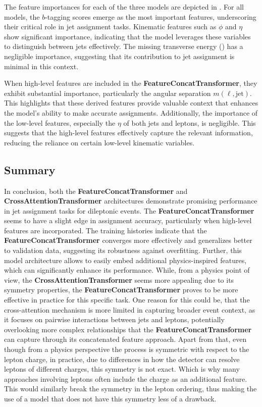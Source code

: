 The feature importances for each of the three models are depicted in . For all models, the $b$-tagging scores emerge as the most important features, underscoring their critical role in jet assignment tasks. Kinematic features such as $\phi$ and $\eta$ show significant importance, indicating that the model leverages these variables to distinguish between jets effectively. The missing transverse energy (\met) has a negligible importance, suggesting that its contribution to jet assignment is minimal in this context.

When high-level features are included in the \textbf{FeatureConcatTransformer}, they exhibit substantial importance, particularly the angular separation $m(\ell,\text{jet})$. This highlights that these derived features provide valuable context that enhances the model's ability to make accurate assignments. Additionally, the importance of the low-level features, especially the $\eta$ of both jets and leptons, is negligible. This suggests that the high-level features effectively capture the relevant information, reducing the reliance on certain low-level kinematic variables.

\subsection{Summary}
In conclusion, both the \textbf{FeatureConcatTransformer} and \textbf{CrossAttentionTransformer} architectures demonstrate promising performance in jet assignment tasks for dileptonic \ttbar events. The \textbf{FeatureConcatTransformer} seems to have a slight edge in assignment accuracy, particularly when high-level features are incorporated. The training histories indicate that the \textbf{FeatureConcatTransformer} converges more effectively and generalizes better to validation data, suggesting its robustness against overfitting. Further, this model architecture allows to easily embed additional physics-inspired features, which can significantly enhance its performance. While, from a physics point of view, the \textbf{CrossAttentionTransformer} seems more appealing due to its symmetry properties, the \textbf{FeatureConcatTransformer} proves to be more effective in practice for this specific task. One reason for this could be, that the cross-attention mechanism is more limited in capturing broader event context, as it focuses on pairwise interactions between jets and leptons, potentially overlooking more complex relationships that the \textbf{FeatureConcatTransformer} can capture through its concatenated feature approach.
Apart from that, even though from a physics perspective the process is symmetric with respect to the lepton charge, in practice, due to differences in how the detector can resolve leptons of different charges, this symmetry is not exact. Which is why many approaches involving leptons often include the charge as an additional feature. This would similarly break the symmetry in the lepton ordering, thus making the use of a model that does not have this symmetry less of a drawback.